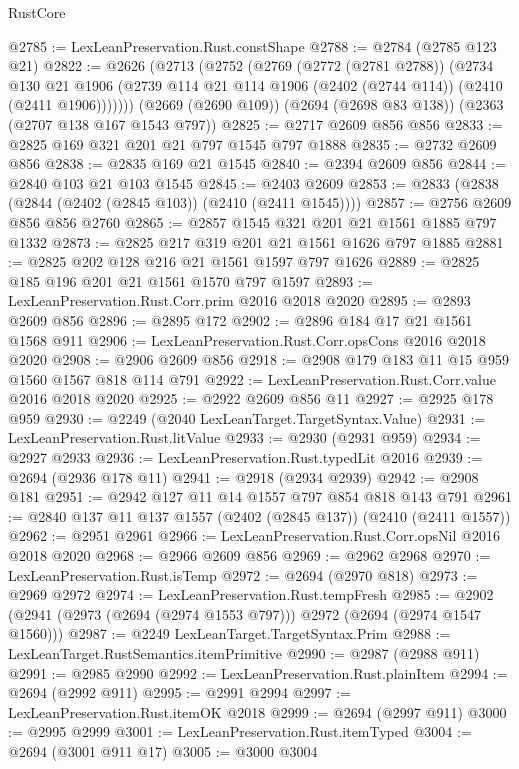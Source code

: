 \begin{lexlean}{RustCore}
\begin{coremodule}
@2785 := LexLeanPreservation.Rust.constShape
@2788 := @2784 (@2785 @123 @21)
@2822 := @2626
    (@2713
      (@2752
        (@2769
          (@2772 (@2781 @2788))
          (@2734
            @130
            @21
            @1906
            (@2739 @114 @21 @114 @1906 (@2402 (@2744 @114)) (@2410 (@2411 @1906)))))))
    (@2669 (@2690 @109))
    (@2694 (@2698 @83 @138))
    (@2363 (@2707 @138 @167 @1543 @797))
@2825 := @2717 @2609 @856 @856
@2833 := @2825 @169 @321 @201 @21 @797 @1545 @797 @1888
@2835 := @2732 @2609 @856
@2838 := @2835 @169 @21 @1545
@2840 := @2394 @2609 @856
@2844 := @2840 @103 @21 @103 @1545
@2845 := @2403 @2609
@2853 := @2833 (@2838 (@2844 (@2402 (@2845 @103)) (@2410 (@2411 @1545))))
@2857 := @2756 @2609 @856 @856 @2760
@2865 := @2857 @1545 @321 @201 @21 @1561 @1885 @797 @1332
@2873 := @2825 @217 @319 @201 @21 @1561 @1626 @797 @1885
@2881 := @2825 @202 @128 @216 @21 @1561 @1597 @797 @1626
@2889 := @2825 @185 @196 @201 @21 @1561 @1570 @797 @1597
@2893 := LexLeanPreservation.Rust.Corr.prim @2016 @2018 @2020
@2895 := @2893 @2609 @856
@2896 := @2895 @172
@2902 := @2896 @184 @17 @21 @1561 @1568 @911
@2906 := LexLeanPreservation.Rust.Corr.opsCons @2016 @2018 @2020
@2908 := @2906 @2609 @856
@2918 := @2908 @179 @183 @11 @15 @959 @1560 @1567 @818 @114 @791
@2922 := LexLeanPreservation.Rust.Corr.value @2016 @2018 @2020
@2925 := @2922 @2609 @856 @11
@2927 := @2925 @178 @959
@2930 := @2249 (@2040 LexLeanTarget.TargetSyntax.Value)
@2931 := LexLeanPreservation.Rust.litValue
@2933 := @2930 (@2931 @959)
@2934 := @2927 @2933
@2936 := LexLeanPreservation.Rust.typedLit @2016
@2939 := @2694 (@2936 @178 @11)
@2941 := @2918 (@2934 @2939)
@2942 := @2908 @181
@2951 := @2942 @127 @11 @14 @1557 @797 @854 @818 @143 @791
@2961 := @2840 @137 @11 @137 @1557 (@2402 (@2845 @137)) (@2410 (@2411 @1557))
@2962 := @2951 @2961
@2966 := LexLeanPreservation.Rust.Corr.opsNil @2016 @2018 @2020
@2968 := @2966 @2609 @856
@2969 := @2962 @2968
@2970 := LexLeanPreservation.Rust.isTemp
@2972 := @2694 (@2970 @818)
@2973 := @2969 @2972
@2974 := LexLeanPreservation.Rust.tempFresh
@2985 := @2902 (@2941 (@2973 (@2694 (@2974 @1553 @797))) @2972 (@2694 (@2974 @1547 @1560)))
@2987 := @2249 LexLeanTarget.TargetSyntax.Prim
@2988 := LexLeanTarget.RustSemantics.itemPrimitive
@2990 := @2987 (@2988 @911)
@2991 := @2985 @2990
@2992 := LexLeanPreservation.Rust.plainItem
@2994 := @2694 (@2992 @911)
@2995 := @2991 @2994
@2997 := LexLeanPreservation.Rust.itemOK @2018
@2999 := @2694 (@2997 @911)
@3000 := @2995 @2999
@3001 := LexLeanPreservation.Rust.itemTyped
@3004 := @2694 (@3001 @911 @17)
@3005 := @3000 @3004

\end{coremodule}
\end{lexlean}
